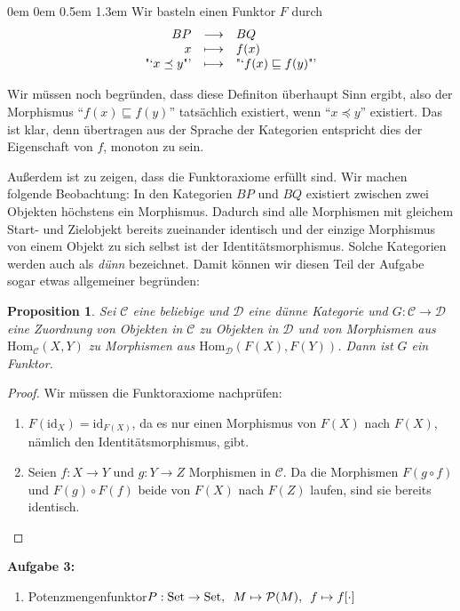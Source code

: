 \documentclass[a4paper,ngerman]{scrartcl}
\theoremstyle{definition}
\theoremstyle{plain}
\newtheorem*{prop}{Proposition}
\theoremstyle{remark}
\newcommand{\C}{\mathcal{C}}
\newcommand{\Hom}{\mathrm{Hom}}
\newcommand{\Set}{\mathrm{Set}}
\newcommand{\id}{\mathrm{id}}
\newcommand{\D}{\mathcal{D}}
\begin{document}
\begin{list}{}{0em \leftmargin0em \itemindent0.5em \itemsep 1.3em}
Wir basteln einen Funktor $F$ durch
\[ \begin{array}{@{}rcl@{}}
  BP &\longrightarrow& BQ\\
  x  &\longmapsto& f(x)\\
  \text{"`$x \preceq y$"'} &\longmapsto& \text{"`$f(x) \sqsubseteq f(y)$"'}
\end{array} \]

Wir müssen noch begründen, dass diese Definiton überhaupt Sinn ergibt, also der Morphismus "`$f(x) \sqsubseteq f(y)$"' tatsächlich existiert, wenn "`$x \preceq y$"' existiert. Das ist klar, denn übertragen aus der Sprache der Kategorien entspricht dies der Eigenschaft von $f$, monoton zu sein.

Außerdem ist zu zeigen, dass die Funktoraxiome erfüllt sind. Wir machen folgende Beobachtung: In den Kategorien $BP$ und $BQ$ existiert zwischen zwei Objekten höchstens ein Morphismus. Dadurch sind alle Morphismen mit gleichem Start- und Zielobjekt bereits zueinander identisch und der einzige Morphismus von einem Objekt zu sich selbst ist der Identitätsmorphismus. Solche Kategorien werden auch als \emph{dünn} bezeichnet. Damit können wir diesen Teil der Aufgabe sogar etwas allgemeiner begründen:\\


\begin{prop}
  Sei $\C$ eine beliebige und $\D$ eine dünne Kategorie und $G : \C \to \D$ eine Zuordnung von Objekten in $\C$ zu Objekten in $\D$ und von Morphismen aus $\Hom_\C(X, Y)$ zu Morphismen aus $\Hom_\D(F(X), F(Y))$. Dann ist $G$ ein Funktor.
\end{prop}

\begin{proof}
Wir müssen die Funktoraxiome nachprüfen:
\begin{enumerate}
\item $F(\id_X) = \id_{F(X)}$, da es nur einen Morphismus von $F(X)$ nach $F(X)$, nämlich den Identitätsmorphismus, gibt.
\item Seien $f : X \to Y$ und $g : Y \to Z$ Morphismen in $\C$. Da die Morphismen $F(g \circ f)$ und $F(g) \circ F(f)$ beide von $F(X)$ nach $F(Z)$ laufen, sind sie bereits identisch.\qedhere
\end{enumerate}
\end{proof}

\item[\textbf{Aufgabe 3:}]\mbox{}

\begin{enumerate}
\item Potenzmengenfunktor\enskip$P : \Set \to \Set, \enskip M \mapsto \mathcal{P}(M), \enskip f \mapsto f[\cdot]$


\end{enumerate}
\end{list}
\end{document}
